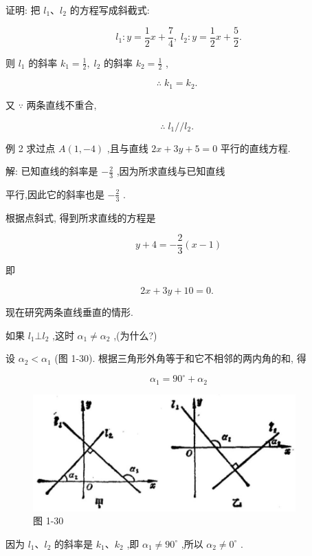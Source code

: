 \documentclass[lang=cn,newtx,10pt,scheme=chinese]{elegantbook}
\begin{document}
证明: 把 \({l}_{1}\text{、}{l}_{2}\) 的方程写成斜截式:

\[
    {l}_{1} : y = \frac{1}{2}x + \frac{7}{4},\;{l}_{2} : y = \frac{1}{2}x + \frac{5}{2}.
\]

则 \({l}_{1}\) 的斜率 \({k}_{1} = \frac{1}{2},\;{l}_{2}\) 的斜率 \({k}_{2} = \frac{1}{2}\) ,

\[
  \therefore \;{k}_{1} = {k}_{2}\text{. }
\]

又 \(\because\) 两条直线不重合,

\[
  \therefore \;{l}_{1}//{l}_{2}\text{. }
\]

例 2 求过点 \(A\left( {1, - 4}\right)\) ,且与直线 \({2x} + {3y} + 5 = 0\) 平行的直线方程.

解: 已知直线的斜率是 \(- \frac{2}{3}\) ,因为所求直线与已知直线

平行,因此它的斜率也是 \(- \frac{2}{3}\) .

根据点斜式, 得到所求直线的方程是

\[
  y + 4 = - \frac{2}{3}\left( {x - 1}\right)
\]

即

\[
    {2x} + {3y} + {10} = 0\text{. }
\]

现在研究两条直线垂直的情形.

如果 \({l}_{1} \bot {l}_{2}\) ,这时 \({\alpha }_{1} \neq {\alpha }_{2}\) ,(为什么?)

设 \({\alpha }_{2} < {\alpha }_{1}\) (图 1-30). 根据三角形外角等于和它不相邻的两内角的和, 得

\[
    {\alpha }_{1} = {90}^{ \circ } + {\alpha }_{2}
\]

\begin{figure}[h]
  \centering
  \includegraphics[max width=0.9\textwidth]{images/01912cc2-ffb6-728e-9ae7-b113ff05c64b_44_991124.jpg}
  \caption{图 1-30}
\end{figure}



因为 \({l}_{1}\text{、}{l}_{2}\) 的斜率是 \({k}_{1}\text{、}{k}_{2}\) ,即 \({\alpha }_{1} \neq {90}^{ \circ }\) ,所以 \({\alpha }_{2} \neq {0}^{ \circ }\) .
\end{document}

